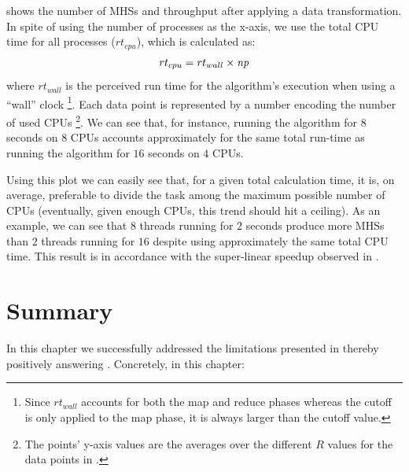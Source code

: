  shows the number of
\acp{MHS} and throughput after applying a data transformation.
%
In spite of using the number of processes as the x-axis, we use the
total \ac{CPU} time for all processes ($rt_{cpu}$), which is
calculated as:
\begin{equation}
  rt_{cpu} = rt_{wall} \times \mathit{np}
\end{equation}
where $rt_{wall}$ is the perceived run time for the algorithm's
execution when using a ``wall'' clock%
\footnote{Since $rt_{wall}$ accounts for both the map and reduce
  phases whereas the cutoff is only applied to the map phase, it is
  always larger than the cutoff value.}.
%
Each data point is represented by a number encoding the number of used
\acp{CPU}%
\footnote{The points' y-axis values are the averages over the
  different $R$ values for the data points in
  .}.
%
We can see that, for instance, running the algorithm for $8$ seconds
on $8$ \acp{CPU} accounts approximately for the same total run-time as
running the algorithm for $16$ seconds on $4$ \acp{CPU}.


Using this plot we can easily see that, for a given total calculation
time, it is, on average, preferable to divide the task among the
maximum possible number of \acp{CPU} (eventually, given enough
\acp{CPU}, this trend should hit a ceiling).
%
As an example, we can see that $8$ threads running for $2$ seconds
produce more \acp{MHS} than $2$ threads running for $16$ despite using
approximately the same total \ac{CPU} time.
%
This result is in accordance with the super-linear
speedup observed in .

\section{Summary}
In this chapter we successfully addressed the limitations presented in
thereby positively answering .
%
Concretely, in this chapter:

